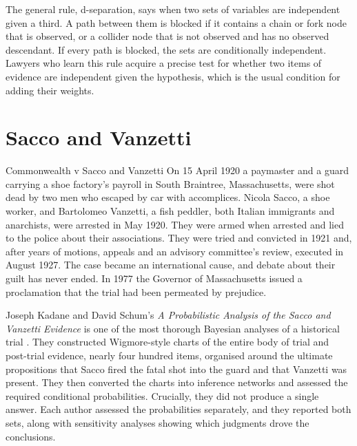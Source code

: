 The general rule, d-separation, says when two sets of variables are independent given a third. A path between them is blocked if it contains a chain or fork node that is observed, or a collider node that is not observed and has no observed descendant. If every path is blocked, the sets are conditionally independent. Lawyers who learn this rule acquire a precise test for whether two items of evidence are independent given the hypothesis, which is the usual condition for adding their weights.

\section{Sacco and Vanzetti}

\begin{casebox}{Commonwealth v Sacco and Vanzetti}
On 15 April 1920 a paymaster and a guard carrying a shoe factory's payroll in South Braintree, Massachusetts, were shot dead by two men who escaped by car with accomplices. Nicola Sacco, a shoe worker, and Bartolomeo Vanzetti, a fish peddler, both Italian immigrants and anarchists, were arrested in May 1920. They were armed when arrested and lied to the police about their associations. They were tried and convicted in 1921 and, after years of motions, appeals and an advisory committee's review, executed in August 1927. The case became an international cause, and debate about their guilt has never ended. In 1977 the Governor of Massachusetts issued a proclamation that the trial had been permeated by prejudice.
\end{casebox}

Joseph Kadane and David Schum's \emph{A Probabilistic Analysis of the Sacco and Vanzetti Evidence} is one of the most thorough Bayesian analyses of a historical trial \citep{kadane_schum1996}. They constructed Wigmore-style charts of the entire body of trial and post-trial evidence, nearly four hundred items, organised around the ultimate propositions that Sacco fired the fatal shot into the guard and that Vanzetti was present. They then converted the charts into inference networks and assessed the required conditional probabilities. Crucially, they did not produce a single answer. Each author assessed the probabilities separately, and they reported both sets, along with sensitivity analyses showing which judgments drove the conclusions.


